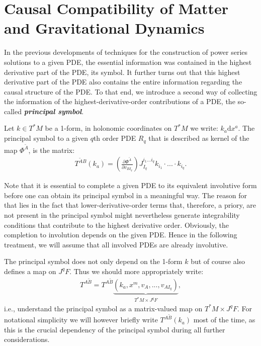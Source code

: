 \section{Causal Compatibility of Matter and Gravitational Dynamics}
In the previous developments of techniques for the construction of power series solutions to a given PDE, the essential information was contained in the highest derivative part of the PDE, its symbol. 
It further turns out that this highest derivative part of the PDE also contains the entire information regarding the causal structure of the PDE. To that end, we introduce a second way of collecting the information of the highest-derivative-order contributions of a PDE, the so-called \textbf{\textit{principal symbol}}.
\begin{definition} \label{PSym}
Let $ k \in T^{\ast}M$ be a  1-form, in holonomic coordinates on $T^{\ast}M$ we write: $k_{a} \mathrm{d}x^a$. The principal symbol to a given $q$th order PDE $R_q$ that is described as kernel of the map $\Phi^{\tilde{A}}$, is the matrix:
\begin{align}
    T^{\tilde{A} B}(k_a) = \left ( \frac{\partial \Phi^{\tilde{A}}}{\partial v_{BI_q}} \right ) J_{I_q}^{i_1...i_q} k_{i_1} \cdot ... \cdot k_{i_q}.
\end{align}
\end{definition}
\begin{remark}
Note that it is essential to complete a given PDE to its equivalent involutive form before one can obtain its principal symbol in a meaningful way. The reason for that lies in the fact that lower-derivative-order terms that, therefore, a priory, are not present in the principal symbol might nevertheless generate integrability conditions that contribute to the highest derivative order. Obviously, the completion to involution depends on the given PDE. Hence in the following treatment, we will assume that all involved PDEs are already involutive.
\end{remark}
The principal symbol does not only depend on the 1-form $k$ but of course also defines a map on $J^qF$. Thus we should more appropriately write:
\begin{align}
    T^{A\tilde{B}} = T^{A\tilde{B}}\underbrace{(k_a,x^m,v_A,...,v_{AI_q})}_{T^{\ast}M \times J^qF},
\end{align}
i.e., understand the principal symbol as a matrix-valued map on $T^{\ast}M \times J^qF$. 
For notational simplicity we will however briefly write $T^{A\tilde{B}}(k_a)$ most of the time, as this is the crucial dependency of the principal symbol during all further considerations.

